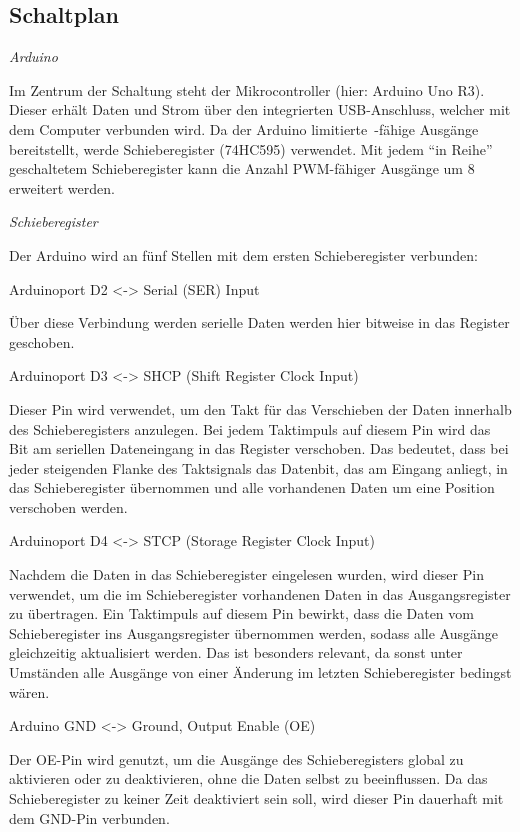\subsection{Schaltplan}

\textit{Arduino}

Im Zentrum der Schaltung steht der Mikrocontroller (hier: Arduino Uno R3).
Dieser erhält Daten und Strom über den integrierten USB-Anschluss, welcher mit dem Computer verbunden wird.
Da der Arduino limitierte~-fähige Ausgänge bereitstellt, werde Schieberegister (74HC595) verwendet.
Mit jedem ``in Reihe'' geschaltetem Schieberegister kann die Anzahl PWM-fähiger Ausgänge um 8 erweitert werden.

\textit{Schieberegister}

Der Arduino wird an fünf Stellen mit dem ersten Schieberegister verbunden:

Arduinoport D2 <-> Serial (SER) Input

Über diese Verbindung werden serielle Daten werden hier bitweise in das Register geschoben.

Arduinoport D3 <-> SHCP (Shift Register Clock Input)

Dieser Pin wird verwendet, um den Takt für das Verschieben der Daten innerhalb des Schieberegisters anzulegen.
Bei jedem Taktimpuls auf diesem Pin wird das Bit am seriellen Dateneingang in das Register verschoben.
Das bedeutet, dass bei jeder steigenden Flanke des Taktsignals das Datenbit, das am Eingang anliegt, in das Schieberegister übernommen und alle vorhandenen Daten um eine Position verschoben werden.

Arduinoport D4 <-> STCP (Storage Register Clock Input)

Nachdem die Daten in das Schieberegister eingelesen wurden, wird dieser Pin verwendet, um die im Schieberegister vorhandenen Daten in das Ausgangsregister zu übertragen.
Ein Taktimpuls auf diesem Pin bewirkt, dass die Daten vom Schieberegister ins Ausgangsregister übernommen werden, sodass alle Ausgänge gleichzeitig aktualisiert werden.
Das ist besonders relevant, da sonst unter Umständen alle Ausgänge von einer Änderung im letzten Schieberegister bedingst wären.

Arduino GND <-> Ground, Output Enable (OE)

Der OE-Pin wird genutzt, um die Ausgänge des Schieberegisters global zu aktivieren oder zu deaktivieren, ohne die Daten selbst zu beeinflussen.
Da das Schieberegister zu keiner Zeit deaktiviert sein soll, wird dieser Pin dauerhaft mit dem GND-Pin verbunden.

